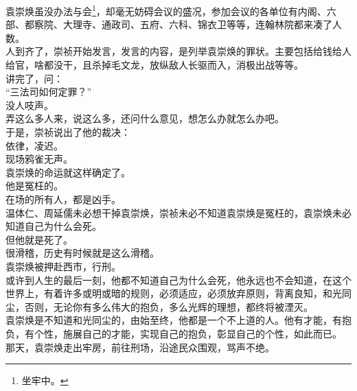 \begin{multicols}{\theparacolNo}
袁崇焕虽没办法与会\footnote{坐牢中。}，却毫无妨碍会议的盛况，参加会议的各单位有内阁、六部、都察院、大理寺、通政司、五府、六科、锦衣卫等等，连翰林院都来凑了人数。\\

人到齐了，崇祯开始发言，发言的内容，是列举袁崇焕的罪状。主要包括给钱给人给官，啥都没干，且杀掉毛文龙，放纵敌人长驱而入，消极出战等等。\\

讲完了，问：\\

“三法司如何定罪？”\\

没人吱声。\\

弄这么多人来，说这么多，还问什么意见，想怎么办就怎么办吧。\\

于是，崇祯说出了他的裁决：\\

依律，凌迟。\\

现场鸦雀无声。\\

袁崇焕的命运就这样确定了。\\

他是冤枉的。\\

在场的所有人，都是凶手。\\

温体仁、周延儒未必想干掉袁崇焕，崇祯未必不知道袁崇焕是冤枉的，袁崇焕未必知道自己为什么会死。\\

但他就是死了。\\

很滑稽，历史有时候就是这么滑稽。\\

袁崇焕被押赴西市，行刑。\\

或许到人生的最后一刻，他都不知道自己为什么会死，他永远也不会知道，在这个世界上，有着许多或明或暗的规则，必须适应，必须放弃原则，背离良知，和光同尘，否则，无论你有多么伟大的抱负，多么光辉的理想，都终将被湮灭。\\

袁崇焕是不知道和光同尘的，由始至终，他都是一个不上道的人。他有才能，有抱负，有个性，施展自己的才能，实现自己的抱负，彰显自己的个性，如此而已。\\

那天，袁崇焕走出牢房，前往刑场，沿途民众围观，骂声不绝。\\


\end{multicols}

